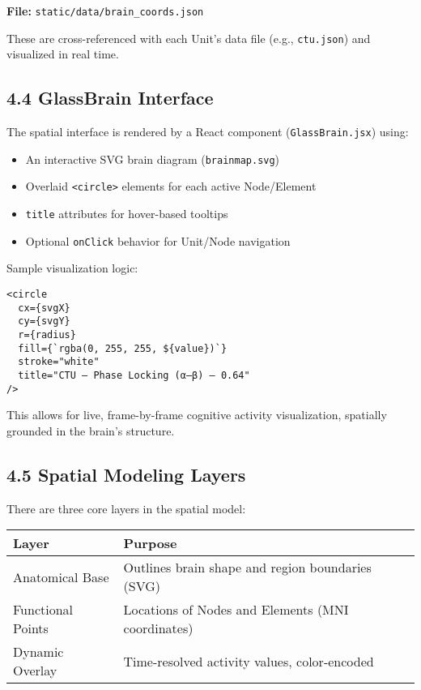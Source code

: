 \documentclass[10pt]{article}
\begin{document}
\textbf{File:} \texttt{static/data/brain\_coords.json}

These are cross-referenced with each Unit’s data file (e.g., \texttt{ctu.json}) and visualized in real time.

\subsection*{4.4 GlassBrain Interface}

The spatial interface is rendered by a React component (\texttt{GlassBrain.jsx}) using:

\begin{itemize}
    \item An interactive SVG brain diagram (\texttt{brainmap.svg})
    \item Overlaid \texttt{<circle>} elements for each active Node/Element
    \item \texttt{title} attributes for hover-based tooltips
    \item Optional \texttt{onClick} behavior for Unit/Node navigation
\end{itemize}

Sample visualization logic:

\begin{verbatim}
<circle
  cx={svgX}
  cy={svgY}
  r={radius}
  fill={`rgba(0, 255, 255, ${value})`}
  stroke="white"
  title="CTU – Phase Locking (α–β) – 0.64"
/>
\end{verbatim}

This allows for live, frame-by-frame cognitive activity visualization, spatially grounded in the brain’s structure.

\subsection*{4.5 Spatial Modeling Layers}

There are three core layers in the spatial model:

\begin{center}
\begin{tabular}{|l|p{9cm}|}
\hline
\textbf{Layer} & \textbf{Purpose} \\
\hline
Anatomical Base & Outlines brain shape and region boundaries (SVG) \\
Functional Points & Locations of Nodes and Elements (MNI coordinates) \\
Dynamic Overlay & Time-resolved activity values, color-encoded \\
\hline
\end{tabular}
\end{center}
\end{document}
